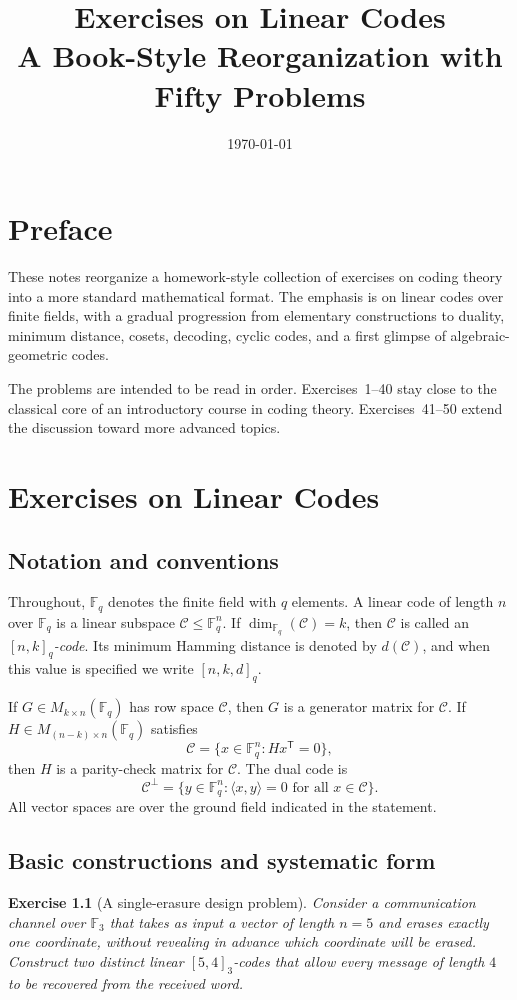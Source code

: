 \documentclass[11pt]{amsbook}
\title{Exercises on Linear Codes\\\large A Book-Style Reorganization with Fifty Problems}
\author{}
\date{\today}
\theoremstyle{exstyle}
\newtheorem{exercise}{Exercise}
\theoremstyle{plain}
\newcommand{\F}{\mathbb{F}}
\newcommand{\Ccal}{\mathcal{C}}
\newcommand{\inner}[2]{\langle #1,#2\rangle}
\newcommand{\transpose}{\mathsf{T}}
\begin{document}
\frontmatter
\maketitle
\tableofcontents

\chapter*{Preface}
These notes reorganize a homework-style collection of exercises on coding theory into a more standard mathematical format. The emphasis is on linear codes over finite fields, with a gradual progression from elementary constructions to duality, minimum distance, cosets, decoding, cyclic codes, and a first glimpse of algebraic-geometric codes.

The problems are intended to be read in order. Exercises~1--40 stay close to the classical core of an introductory course in coding theory. Exercises~41--50 extend the discussion toward more advanced topics.

\chapter{Exercises on Linear Codes}

\section{Notation and conventions}
Throughout, $\F_q$ denotes the finite field with $q$ elements. A linear code of length $n$ over $\F_q$ is a linear subspace $\Ccal \leq \F_q^n$. If $\dim_{\F_q}(\Ccal)=k$, then $\Ccal$ is called an \emph{$[n,k]_q$-code}. Its minimum Hamming distance is denoted by $d(\Ccal)$, and when this value is specified we write $[n,k,d]_q$.

If $G\in M_{k\times n}(\F_q)$ has row space $\Ccal$, then $G$ is a generator matrix for $\Ccal$. If $H\in M_{(n-k)\times n}(\F_q)$ satisfies
\[
\Ccal=\{x\in\F_q^n:Hx^{\transpose}=0\},
\]
then $H$ is a parity-check matrix for $\Ccal$. The dual code is
\[
\Ccal^{\perp}=\{y\in\F_q^n:\inner{x}{y}=0\text{ for all }x\in\Ccal\}.
\]
All vector spaces are over the ground field indicated in the statement.

\section{Basic constructions and systematic form}

\begin{exercise}[A single-erasure design problem]
Consider a communication channel over $\F_3$ that takes as input a vector of length $n=5$ and erases exactly one coordinate, without revealing in advance which coordinate will be erased. Construct two distinct linear $[5,4]_3$-codes that allow every message of length $4$ to be recovered from the received word.
\end{exercise}
\end{document}
